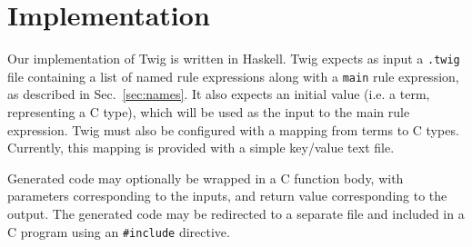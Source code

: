 
\section{Implementation}

Our implementation of Twig is written in Haskell. Twig expects as input a \texttt{.twig} file containing a list of named rule expressions along with a \texttt{main} rule expression, as described in Sec.~\ref{sec:names}. It also expects an initial value (i.e. a term, representing a C type), which will be used as the input to the main rule expression. Twig must also be configured with a mapping from terms to C types. Currently, this mapping is provided with a simple key/value text file.

Generated code may optionally be wrapped in a C function body, with parameters corresponding to the inputs, and return value corresponding to the output. The generated code may be redirected to a separate file and included in a C program using an \texttt{\#include} directive.

